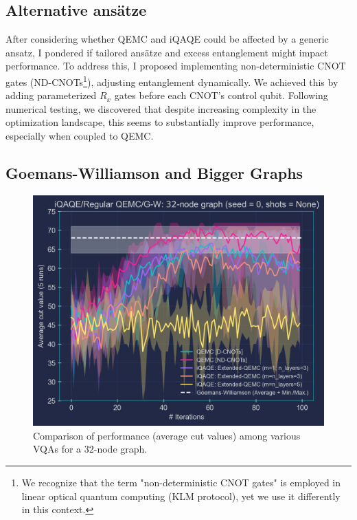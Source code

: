 \subsection{Alternative ansätze}
\label{subsection:Alternative_Ansätze}
After considering whether QEMC and iQAQE could be affected by a generic ansatz, I pondered if tailored ansätze and excess entanglement might impact performance. To address this, I proposed implementing non-deterministic CNOT gates (ND-CNOTs\footnote{We recognize that the term "non-deterministic CNOT gates" is employed in linear optical quantum computing (KLM protocol), yet we use it differently in this context.}), adjusting entanglement dynamically. We achieved this by adding parameterized $R_x$ gates before each CNOT's control qubit. Following numerical testing, we discovered that despite increasing complexity in the optimization landscape, this seems to substantially improve performance, especially when coupled to QEMC.

\subsection{Goemans-Williamson and Bigger Graphs}
\label{subsection:GW_Bigger_Graphs}

\begin{figure}[H]
    \centering
    \includegraphics[width=0.95\columnwidth]{Figures/Large graphs/32-node_Graph_seed=0.png}
    \caption{Comparison of performance (average cut values) among various VQAs for a $32$-node graph.}
    \label{fig:32-node_Graph}
\end{figure}

